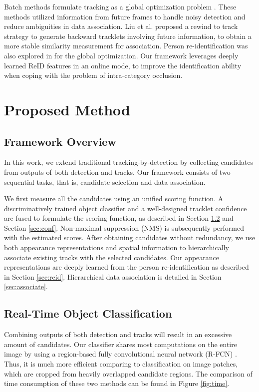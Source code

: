 \documentclass{article}
\begin{document}
Batch methods formulate tracking as a global optimization problem \cite{yan2012track,kim2015multiple,tang2017multiple,guan2014multi}.
These methods utilized information from future frames
to handle noisy detection and reduce ambiguities in data association.
Liu et al. \cite{liu2017rewind} proposed a rewind to track strategy to generate backward tracklets involving future information,
to obtain a more stable similarity measurement for association.
Person re-identification was also explored in \cite{tang2017multiple,guan2014multi,tang2016multi} for the global optimization.
Our framework leverages deeply learned ReID features in an online mode, 
to improve the identification ability when coping with the problem of intra-category occlusion.



\section{Proposed Method}

\subsection{Framework Overview}
In this work,
we extend traditional tracking-by-detection
by collecting candidates from outputs of both detection and tracks.
Our framework consists of two sequential tasks, that is,
candidate selection and data association.

We first measure all the candidates using an unified scoring function.
A discriminatively trained object classifier 
and a well-designed tracklet confidence are fused to formulate the scoring function,
as described in Section \ref{sec:rfcn} and Section \ref{sec:conf}.
Non-maximal suppression (NMS) is subsequently performed with the estimated scores.
After obtaining candidates without redundancy,
we use both appearance representations and spatial information 
to hierarchically associate existing tracks with the selected candidates.
Our appearance representations are deeply learned from the person re-identification as described in Section \ref{sec:reid}.
Hierarchical data association is detailed in Section \ref{sec:associate}.



\subsection{Real-Time Object Classification}
\label{sec:rfcn}
Combining outputs of both detection and tracks will result in an excessive amount of candidates.
Our classifier shares most computations on the entire image 
by using a region-based fully convolutional neural network (R-FCN) \cite{dai2016r}.
Thus, it is much more efficient comparing to classification
on image patches, which are cropped from heavily overlapped candidate regions.
The comparison of time consumption of these two methods can be found in Figure \ref{fig:time}.
\end{document}
